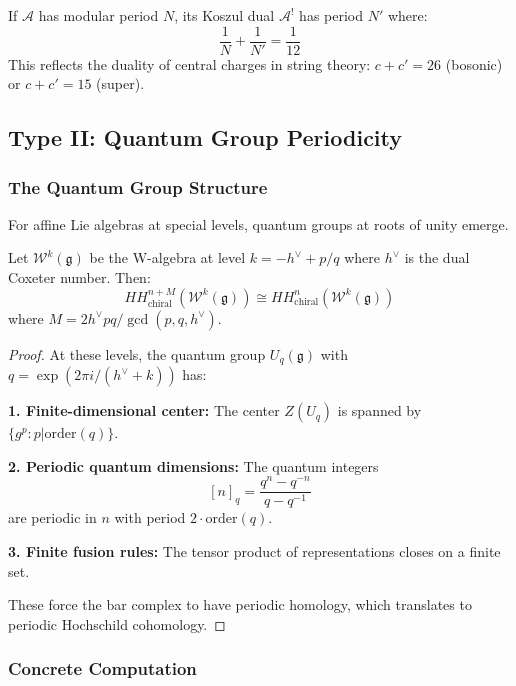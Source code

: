 \begin{theorem}
If $\mathcal{A}$ has modular period $N$, its Koszul dual $\mathcal{A}^!$ has period $N'$ where:
\[
\frac{1}{N} + \frac{1}{N'} = \frac{1}{12}
\]
This reflects the duality of central charges in string theory: $c + c' = 26$ (bosonic) or $c + c' = 15$ (super).
\end{theorem}

\subsection{Type II: Quantum Group Periodicity}

\subsubsection{The Quantum Group Structure}

For affine Lie algebras at special levels, quantum groups at roots of unity emerge.

\begin{theorem}
Let $\mathcal{W}^k(\mathfrak{g})$ be the W-algebra at level $k = -h^{\vee} + p/q$ where $h^{\vee}$ is the dual Coxeter number. Then:
\[
HH^{n+M}_{\text{chiral}}(\mathcal{W}^k(\mathfrak{g})) \cong HH^n_{\text{chiral}}(\mathcal{W}^k(\mathfrak{g}))
\]
where $M = 2h^{\vee}pq/\gcd(p,q,h^{\vee})$.
\end{theorem}

\begin{proof}
At these levels, the quantum group $U_q(\mathfrak{g})$ with $q = \exp(2\pi i/(h^{\vee} + k))$ has:

\textbf{1. Finite-dimensional center:} The center $Z(U_q)$ is spanned by $\{g^p : p | \text{order}(q)\}$.

\textbf{2. Periodic quantum dimensions:} The quantum integers
\[
[n]_q = \frac{q^n - q^{-n}}{q - q^{-1}}
\]
are periodic in $n$ with period $2\cdot\text{order}(q)$.

\textbf{3. Finite fusion rules:} The tensor product of representations closes on a finite set.

These force the bar complex to have periodic homology, which translates to periodic Hochschild cohomology.
\end{proof}

\subsubsection{Concrete Computation}

